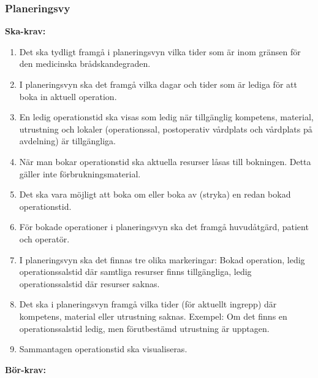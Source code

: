 \documentclass[twoside]{article}
\begin{document}
\subsubsection{Planeringsvy}\label{subsubsec:Planeringsvy}
\textbf{Ska-krav: }
\begin{enumerate}[resume]
\item Det ska tydligt framgå i planeringsvyn vilka tider som är inom gränsen
för den medicinska brådskandegraden.
\item I planeringsvyn ska det framgå vilka dagar och tider som är lediga för
att boka in aktuell operation.
\item En ledig operationstid ska visas som ledig när tillgänglig kompetens,
material, utrustning och lokaler (operationssal, postoperativ vårdplats och
vårdplats på avdelning) är tillgängliga.
\item När man bokar operationstid ska aktuella resurser låsas till bokningen.
Detta gäller inte förbrukningsmaterial.
\item Det ska vara möjligt att boka om eller boka av (stryka) en redan bokad
operationstid.
\item För bokade operationer i planeringsvyn ska det framgå huvudåtgärd,
patient och operatör.
\item I planeringsvyn ska det finnas tre olika markeringar: Bokad operation,
ledig operationssalstid där samtliga resurser finns tillgängliga, ledig
operationssalstid där resurser saknas.
\item Det ska i planeringsvyn framgå vilka tider (för aktuellt ingrepp) där
kompetens, material eller utrustning saknas.
Exempel: Om det finns en operationssalstid ledig, men förutbestämd utrustning
är upptagen.
\item Sammantagen operationstid ska visualiseras.
\end{enumerate}
\textbf{Bör-krav: }
\end{document}
